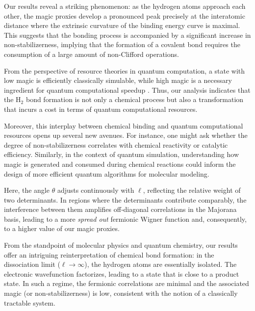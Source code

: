 \documentclass[aps, prl, twocolumn, groupedaddress, reprint, floatfix, nofootinbib, longbibliography]{revtex4-2}
\begin{document}
        Our results reveal a striking phenomenon: as the hydrogen atoms approach each other, the magic proxies develop a pronounced peak precisely at the interatomic distance where the extrinsic curvature of the binding energy curve is maximal. This suggests that the bonding process is accompanied by a significant increase in non-stabilizerness, implying that the formation of a covalent bond requires the consumption of a large amount of non-Clifford operations.

        From the perspective of resource theories in quantum computation, a state with low magic is efficiently classically simulable, while high magic is a necessary ingredient for quantum computational speedup \cite{howard2014contextuality,Veitch2014Resource}. Thus, our analysis indicates that the H$_2$ bond formation is not only a chemical process but also a transformation that incurs a cost in terms of quantum computational resources.

        Moreover, this interplay between chemical binding and quantum computational resources opens up several new avenues. For instance, one might ask whether the degree of non-stabilizerness correlates with chemical reactivity or catalytic efficiency. Similarly, in the context of quantum simulation, understanding how magic is generated and consumed during chemical reactions could inform the design of more efficient quantum algorithms for molecular modeling.

        Here, the angle $\theta$ adjusts continuously with $\ell$, reflecting the relative weight of two determinants. In regions where the determinants contribute comparably, the interference between them amplifies off‑diagonal correlations in the Majorana basis, leading to a more \textit{spread out} fermionic Wigner function and, consequently, to a higher value of our magic proxies.

        From the standpoint of molecular physics and quantum chemistry, our results offer an intriguing reinterpretation of chemical bond formation: in the dissociation limit ($\ell\to\infty$), the hydrogen atoms are essentially isolated. The electronic wavefunction factorizes, leading to a state that is close to a product state. In such a regime, the fermionic correlations are minimal and the associated magic (or non‑stabilizerness) is low, consistent with the notion of a classically tractable system.
\end{document}
